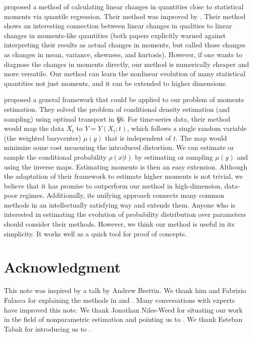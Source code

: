 \documentclass[11pt,letterpaper]{article}
\begin{document}
\cite{McKinnonEtAl_16} proposed a method of calculating linear changes in quantities close to statistical moments via quantile regression. Their method was improved by \cite{FalascaEtAl_22}. Their method shows an interesting connection between linear changes in qualities to linear changes in moments-like quantities (both papers explicitly warned against interpreting their results as actual changes in moments, but called those changes as changes in mean, variance, skewness, and kurtosis). However, if one wants to diagnose the changes in moments directly, our method is numerically cheaper and more versatile. Our method can learn the nonlinear evolution of many statistical quantities not just moments, and it can be extended to higher dimensions. 

\cite{TabakTrigila_18} proposed a general framework that could be applied to our problem of moments estimation. They solved the problem of conditional density estimation (and sampling) using optimal transport in \S6. For time-series data, their method would map the data $X_t$ to $Y = Y(X_t;t)$, which follows a single random variable (the weighted barycenter) $\mu(y)$ that is independent of $t$. The map would minimize some cost measuring the introduced distortion. We can estimate or sample the conditional probability $\rho(x|t)$ by estimating or sampling $\mu(y)$ and using the inverse maps. Estimating moments is then an easy extension. Although the adaptation of their framework to estimate higher moments is not trivial, we believe that it has promise to outperform our method in high-dimension, data-poor regimes. Additionally, its unifying approach connects many common methods in an intellectually satisfying way and extends them. Anyone who is interested in estimating the evolution of probability distribution over parameters should consider their methods. However, we think our method is useful in its simplicity. It works well as a quick tool for proof of concepts.

\section*{Acknowledgment}
This note was inspired by a talk by Andrew Brettin. We thank him and Fabrizio Falasca for explaining the methods in \cite{McKinnonEtAl_16} and \cite{FalascaEtAl_22}. Many conversations with experts have improved this note. We thank Jonathan Niles-Weed for situating our work in the field of nonparametric estimation and pointing us to \cite{Tibshirani_18}. We thank Esteban Tabak for introducing us to \cite{TabakTrigila_18}. 

\newpage
\printbibliography
\end{document}
